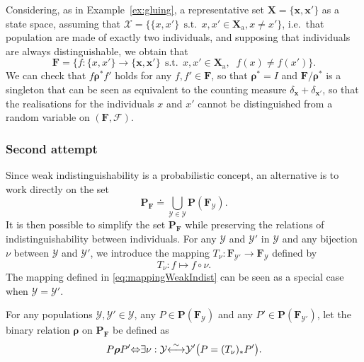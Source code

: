 \documentclass{aptpub}
\numberwithin{equation}{section}
\begin{document}
\begin{example}
\label{ex:naive}
Considering, as in Example~\ref{ex:gluing}, a representative set ${\mathbf{X}} = \{{\mathbf{x}},{\mathbf{x}}'\}$ as a state space, assuming that ${\boldsymbol{\mathcal{X}}} = \{\{x,x'\} {\;\,\mbox{s.t.}\;\,} x,x' \in {\mathbf{X}}_{\mathrm{a}}, x \neq x' \}$, i.e.\ that population are made of exactly two individuals, and supposing that individuals are always distinguishable, we obtain that
{\begin{equation*}{
{\mathbf{F}} = \{ f: \{x,x'\} \to \{{\mathbf{x}},{\mathbf{x}}'\} {\;\,\mbox{s.t.}\;\,} x,x' \in {\mathbf{X}}_{\mathrm{a}} {,\;\;} f(x) \neq f(x') \}.
}\end{equation*}}
We can check that $f{\boldsymbol{\rho}}^*f'$ holds for any $f,f' \in {\mathbf{F}}$, so that ${\boldsymbol{\rho}}^* = I$ and ${\mathbf{F}}/{\boldsymbol{\rho}}^*$ is a singleton that can be seen as equivalent to the counting measure $\delta_{\mathbf{x}}+\delta_{{\mathbf{x}}'}$, so that the realisations for the individuals $x$ and $x'$ cannot be distinguished from a random variable on $({\mathbf{F}},{\mathcal{F}})$.
\end{example}

\subsubsection{Second attempt}

Since weak indistinguishability is a probabilistic concept, an alternative is to work directly on the set
{\begin{equation*}{
{\mathbf{P}}_{\mathbf{F}} {\doteq} \bigcup_{ {\mathcal{Y}} \in {\boldsymbol{\mathcal{Y}}} } {\mathbf{P}}({\mathbf{F}}_{\mathcal{Y}}).
}\end{equation*}}
It is then possible to simplify the set ${\mathbf{P}}_{\mathbf{F}}$ while preserving the relations of indistinguishability between individuals. For any ${\mathcal{Y}}$ and ${\mathcal{Y}}'$ in ${\boldsymbol{\mathcal{Y}}}$ and any bijection $\nu$ between ${\mathcal{Y}}$ and ${\mathcal{Y}}'$, we introduce the mapping $T_{\nu} : {\mathbf{F}}_{{\mathcal{Y}}'} \to {\mathbf{F}}_{\mathcal{Y}}$ defined by
{\begin{equation*}{
T_{\nu}: f \mapsto f \circ \nu.
}\end{equation*}}
The mapping defined in \eqref{eq:mappingWeakIndist} can be seen as a special case when ${\mathcal{Y}} = {\mathcal{Y}}'$.

\begin{definition}
\label{def:equivStrongDist2}
For any populations ${\mathcal{Y}},{\mathcal{Y}}' \in {\boldsymbol{\mathcal{Y}}}$, any $P \in {\mathbf{P}}({\mathbf{F}}_{\mathcal{Y}})$ and any $P' \in {\mathbf{P}}({\mathbf{F}}_{{\mathcal{Y}}'})$, let the binary relation ${\boldsymbol{\rho}}$ on ${\mathbf{P}}_{\mathbf{F}}$ be defined as
{\begin{equation}\label{{def:equivStrongDist2:eq:rhoBar}}{
P {\boldsymbol{\rho}} P' {\Leftrightarrow} \exists \nu : {\mathcal{Y}} {\stackrel{\sim}{{\longleftrightarrow}}} {\mathcal{Y}}' \big( P = (T_{\nu})_*P'\big).
}\end{equation}}
\end{definition}
\end{document}
